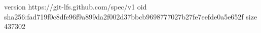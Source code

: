 version https://git-lfs.github.com/spec/v1
oid sha256:fad719f0c8dfe96f9a899da2f002d37bbcb9698777027b27fe7eefde0a5e652f
size 437302
